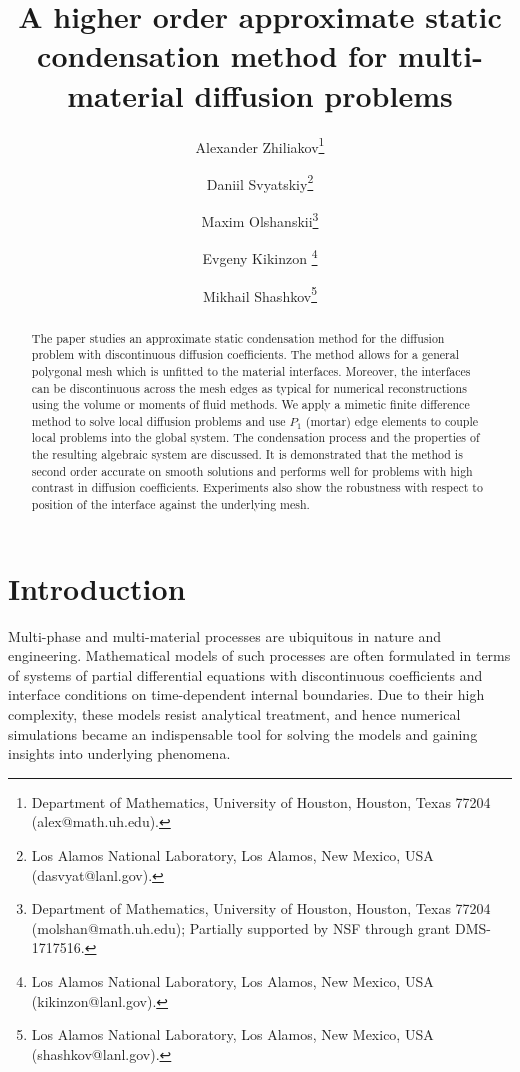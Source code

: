 \documentclass[12pt]{article}
\newcommand{\Sasha}[1]{\colorbox{Cyan}{\textbf{Sasha}:} #1}
\begin{document}
	
\title{A higher order approximate static condensation method for multi-material diffusion problems}
\author{
Alexander Zhiliakov\thanks{Department of Mathematics, University of Houston, Houston, Texas 77204 (alex@math.uh.edu).}
\and Daniil Svyatskiy\thanks{Los Alamos National Laboratory, Los Alamos,
New Mexico, USA (dasvyat@lanl.gov).}
\and
Maxim Olshanskii\thanks{Department of Mathematics, University of Houston, Houston, Texas 77204 (molshan@math.uh.edu); Partially supported by NSF through grant  DMS-1717516.}
\and Evgeny Kikinzon \thanks{Los Alamos National Laboratory, Los Alamos,
  New Mexico, USA (kikinzon@lanl.gov).}
\and Mikhail Shashkov\thanks{Los Alamos National Laboratory, Los Alamos,
  New Mexico, USA (shashkov@lanl.gov).}
}

\maketitle

\let\oldtabular\tabular
\renewcommand{\tabular}[1][1.5]{\def\arraystretch{#1}\oldtabular}

\begin{abstract}
The paper studies an approximate static condensation method for the diffusion problem with discontinuous diffusion coefficients. The method allows for a general polygonal mesh which is unfitted to the material interfaces. Moreover, the interfaces can be discontinuous across the mesh edges as typical for numerical reconstructions using the volume or moments of fluid methods.  We apply a mimetic finite difference method to solve local diffusion problems and use $P_1$ (mortar) edge elements to couple local problems into the global system. The condensation process and the properties of the resulting algebraic system are discussed. It is demonstrated that the method is second order accurate on smooth solutions and performs well for problems with high contrast in diffusion coefficients. Experiments also show the robustness with respect to position of the interface against the underlying mesh.
\end{abstract}


\section{Introduction}
 Multi-phase and multi-material processes are ubiquitous in nature and engineering.
 Mathematical models of such processes are often formulated in terms of systems of partial differential equations with discontinuous coefficients and interface conditions on time-dependent internal boundaries.
 Due to their high complexity, these models   resist analytical treatment, and hence numerical simulations became an indispensable tool for solving the models and gaining insights into underlying phenomena.
\end{document}
